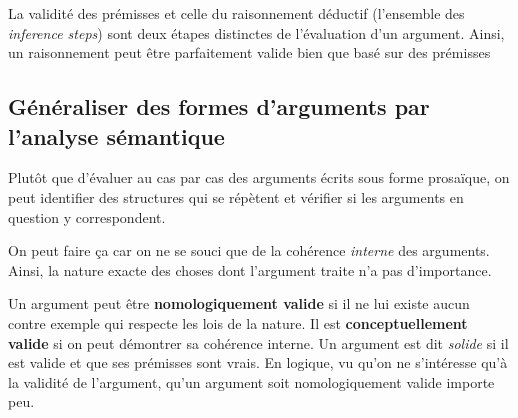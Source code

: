 \documentclass[fleqn,a4paper,nobib]{tufte-handout}
\begin{document}
La validité des prémisses et celle du raisonnement déductif (l'ensemble
des \textit{inference steps})
sont deux étapes distinctes de l'évaluation d'un argument. Ainsi,
un raisonnement peut être parfaitement valide bien que basé sur des prémisses


\subsection{Généraliser des formes d'arguments par l'analyse sémantique}

Plutôt que d'évaluer au cas par cas des arguments écrits sous forme
prosaïque, on peut identifier des structures qui se répètent et
vérifier si les arguments en question y correspondent.

On peut faire ça car on ne se souci que de la cohérence \textit{interne}
des arguments. Ainsi, la nature exacte des choses dont l'argument
traite n'a pas d'importance.

Un argument peut être \textbf{nomologiquement valide} si il ne lui
existe aucun contre exemple qui respecte les lois de la nature.
Il est \textbf{conceptuellement valide} si on peut démontrer sa
cohérence interne. Un argument est dit \textit{solide} si il est
valide et que ses prémisses sont vrais. En logique, vu qu'on ne
s'intéresse qu'à la validité de l'argument, qu'un argument soit
nomologiquement valide importe peu.
\end{document}
